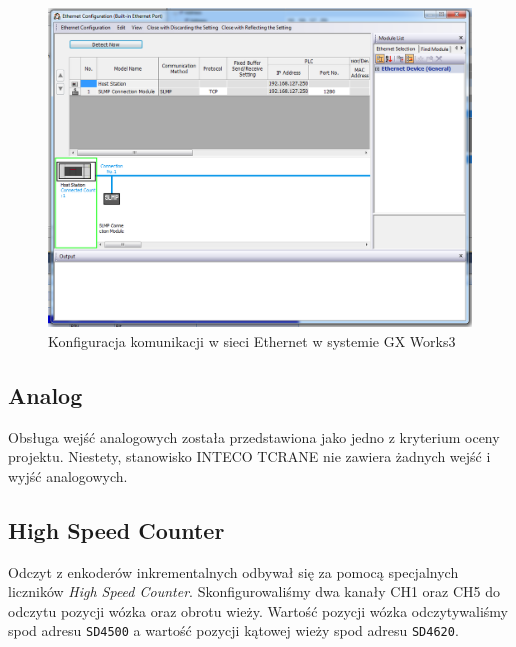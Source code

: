 \documentclass{mwrep}
\begin{document}
\begin{figure}[H]
    \label{PLC::Konfiguracja::Ethernet::Window}
    \centering
    \includegraphics[scale=0.3]{ethernet.png}
    \caption{Konfiguracja komunikacji w sieci Ethernet w systemie GX Works3}
\end{figure}

\subsection{Analog}
\label{PLC::Konfiguracja::Analog}

Obsługa wejść analogowych została przedstawiona jako jedno z kryterium oceny projektu.
Niestety, stanowisko INTECO TCRANE nie zawiera żadnych wejść i wyjść analogowych. 

\subsection{High Speed Counter}
\label{PLC::Konfiguracja::HIOEN}

Odczyt z enkoderów inkrementalnych odbywał się za pomocą specjalnych liczników \emph{High Speed
Counter}. Skonfigurowaliśmy dwa kanały CH1 oraz CH5 do odczytu pozycji wózka oraz obrotu wieży. 
Wartość pozycji wózka odczytywaliśmy spod adresu \texttt{SD4500} a wartość pozycji kątowej wieży 
spod adresu \texttt{SD4620}.

\newpage
\end{document}
